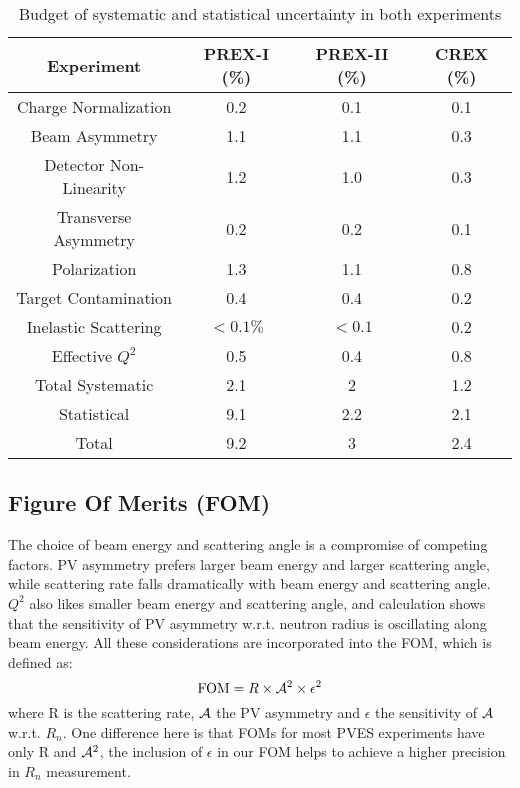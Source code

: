 \begin{table}[hbt!]
    \centering
    \begin{tabular}{c| c c c}
	\hline
	Experiment  & PREX-I (\%)   & PREX-II (\%)	& CREX (\%)	\\
	\hline
	Charge Normalization	& 0.2	& 0.1	& 0.1	\\
	Beam Asymmetry		& 1.1	& 1.1	& 0.3	\\
	Detector Non-Linearity	& 1.2	& 1.0	& 0.3	\\
	Transverse Asymmetry	& 0.2	& 0.2	& 0.1	\\
	Polarization		& 1.3	& 1.1	& 0.8	\\
	Target Contamination	& 0.4	& 0.4	& 0.2	\\
	Inelastic Scattering	& $<0.1\%$  & $<0.1$    & 0.2   \\
	Effective $Q^2$		& 0.5	& 0.4	& 0.8	\\
	\hline
	Total Systematic	& 2.1	& 2	& 1.2	\\
	Statistical		& 9.1	& 2.2	& 2.1	\\
	\hline
	Total			& 9.2	& 3	& 2.4	\\
	\hline
    \end{tabular}
    \caption{Budget of systematic and statistical uncertainty in both experiments 
    \cite{prex-II_proposal, crex_proposal}
    }
\end{table}


\subsection{Figure Of Merits (FOM)}
The choice of beam energy and scattering angle is a compromise of competing
factors. PV asymmetry prefers larger beam energy and larger scattering angle,
while scattering rate falls dramatically with beam energy and scattering angle.
$Q^2$ also likes smaller beam energy and scattering angle, and calculation 
shows that the sensitivity of PV asymmetry w.r.t. neutron radius is oscillating
along beam energy. All these considerations are incorporated into the FOM, which
is defined as:
\begin{equation}
    \text{FOM} = R \times \mathcal{A}^2 \times \epsilon^2
\end{equation}
where R is the scattering rate, $\mathcal{A}$ the PV asymmetry and $\epsilon$ 
the sensitivity of $\mathcal{A}$ w.r.t. $R_n$. One difference here is that FOMs for most PVES 
experiments have only R and $\mathcal{A}^2$, the inclusion of $\epsilon$ in our FOM helps
to achieve a higher precision in $R_n$ measurement.

